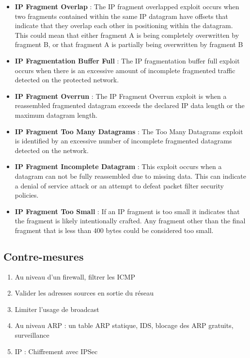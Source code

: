 \documentclass{report}
\begin{document}
\begin{itemize}
    \item \textbf{IP Fragment Overlap} : The IP fragment overlapped exploit occurs when two fragments contained within the same IP datagram have offsets that indicate that they overlap each other in positioning within the datagram. This could mean that either fragment A is being completely overwritten by fragment B, or that fragment A is partially being overwritten by fragment B

    \item \textbf{IP Fragmentation Buffer Full} : The IP fragmentation buffer full exploit occurs when there is an excessive amount of incomplete fragmented traffic detected on the protected network.

    \item \textbf{IP Fragment Overrun} : The IP Fragment Overrun exploit is when a reassembled fragmented datagram exceeds the declared IP data length or the maximum datagram length.

    \item \textbf{IP Fragment Too Many Datagrams} : The Too Many Datagrams exploit is identified by an excessive number of incomplete fragmented datagrams detected on the network.

    \item \textbf{IP Fragment Incomplete Datagram} : This exploit occurs when a datagram can not be fully reassembled due to missing data. This can indicate a denial of service attack or an attempt to defeat packet filter security policies.

    \item \textbf{IP Fragment Too Small} : If an IP fragment is too small it indicates that the fragment is likely intentionally crafted. Any fragment other than the final fragment that is less than 400 bytes could be considered too small.

\end{itemize}

\subsection{Contre-mesures}

\begin{enumerate}
    \item Au niveau d'un firewall, filtrer les ICMP
    \item Valider les adresses sources en sortie du réseau
    \item Limiter l'usage de broadcast
    \item Au niveau ARP : un table ARP statique, IDS, blocage des ARP gratuits, surveillance
    \item IP : Chiffrement avec IPSec
\end{enumerate}
\end{document}
